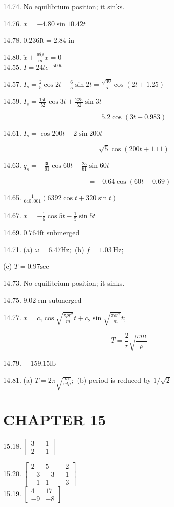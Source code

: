 \documentclass[10pt]{article}
\begin{document}
14.74. No equilibrium position; it sinks.

14.76. $x=-4.80 \sin 10.42 t$

14.78. $0.236 \mathrm{ft}=2.84$ in

14.80. $\ddot{x}+\frac{w l \rho}{m} x=0$\\
14.55. $I=24 t e^{-500 t}$

14.57. $I_{s}=\frac{2}{5} \cos 2 t-\frac{6}{5} \sin 2 t=\frac{\sqrt{40}}{5} \cos (2 t+1.25)$

14.59. $I_{s}=\frac{150}{52} \cos 3 t+\frac{225}{52} \sin 3 t$

$$
=5.2 \cos (3 t-0.983)
$$

14.61. $I_{s}=\cos 200 t-2 \sin 200 t$

$$
=\sqrt{5} \cos (200 t+1.11)
$$

14.63. $q_{s}=-\frac{30}{61} \cos 60 t-\frac{25}{61} \sin 60 t$

$$
=-0.64 \cos (60 t-0.69)
$$

14.65. $\frac{1}{640,001}(6392 \cos t+320 \sin t)$

14.67. $x=-\frac{1}{6} \cos 5 t-\frac{1}{5} \sin 5 t$

14.69. $0.764 \mathrm{ft}$ submerged

14.71. (a) $\omega=6.47 \mathrm{Hz;}$ (b) $f=1.03 \mathrm{~Hz}$;

(c) $T=0.97 \mathrm{sec}$

14.73. No equilibrium position; it sinks.

14.75. $9.02 \mathrm{~cm}$ submerged

14.77. $x=c_{1} \cos \sqrt{\frac{\pi \rho r^{2}}{m}} t+c_{2} \sin \sqrt{\frac{\pi \rho r^{2}}{m}} t ;$

$$
T=\frac{2}{r} \sqrt{\frac{\pi m}{\rho}}
$$

14.79. $\quad 159.15 \mathrm{lb}$

14.81. (a) $T=2 \pi \sqrt{\frac{m}{w l \rho}} ;$ (b) period is reduced by $1 / \sqrt{2}$

\section*{CHAPTER 15}
15.18. $\left[\begin{array}{ll}3 & -1 \\ 2 & -1\end{array}\right]$

15.20. $\left[\begin{array}{rrr}2 & 5 & -2 \\ -3 & -3 & -1 \\ -1 & 1 & -3\end{array}\right]$\\
15.19. $\left[\begin{array}{rr}4 & 17 \\ -9 & -8\end{array}\right]$
\end{document}
